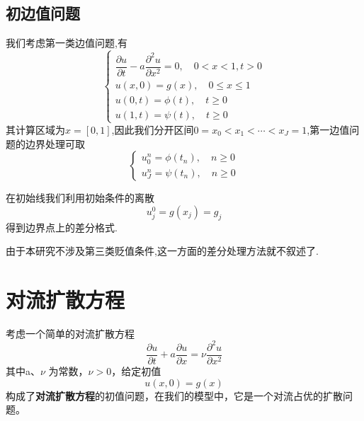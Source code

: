 \subsection{初边值问题}
我们考虑第一类边值问题,有
\begin{equation}
\begin{cases}
\dfrac{\partial u}{\partial t}-a\dfrac{\partial^2 u}{\partial x^2}=0,\quad 0<x<1,t>0 \\
u(x,0)=g(x),\quad 0\leq x\leq 1 \\
u(0,t)=\phi(t),\quad t\geq 0 \\
u(1,t)=\psi(t),\quad t\geq 0 
\end{cases}
\end{equation}
其计算区域为$x=[0,1]$,因此我们分开区间$0=x_0<x_1<\cdots<x_J=1$,第一边值问题的边界处理可取
\begin{equation}
\begin{cases}
u_0^n=\phi(t_n),\quad n\geq0 \\
u_J^n=\psi(t_n),\quad n\geq0
\end{cases}
\end{equation}\par
在初始线我们利用初始条件的离散
\begin{equation}
 u_j^0=g(x_j)=g_j
\end{equation}
得到边界点上的差分格式.\par
由于本研究不涉及第三类贬值条件,这一方面的差分处理方法就不叙述了.

\section{对流扩散方程}
考虑一个简单的对流扩散方程
\begin{equation}\label{equ:cf_dkfangc}
	\dfrac{\partial u}{\partial t}+a\dfrac{\partial u}{\partial x}=\nu\dfrac{\partial^2 u}{\partial x^2}
\end{equation}
其中a、$\nu$ 为常数，$\nu>0$，给定初值
\begin{equation}
	u(x,0)=g(x)
\end{equation}
构成了\textbf{对流扩散方程}的初值问题，在我们的模型中，它是一个对流占优的扩散问题。\par
